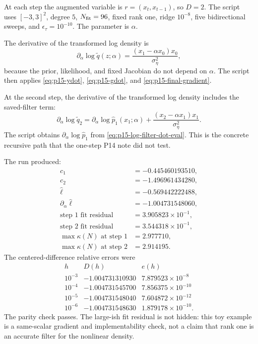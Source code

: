 \documentclass[11pt]{article}
\theoremstyle{definition}
\theoremstyle{remark}
\renewcommand{\[}{\begin{equation}}
\renewcommand{\]}{\end{equation}}
\begin{document}
At each step the augmented variable is \(r=(x_t,x_{t-1})\), so \(D=2\).  The
script uses \([-3,3]^2\), degree \(5\), \(N_{\rm fit}=96\), fixed rank one,
ridge \(10^{-8}\), five bidirectional sweeps, and
\(\epsilon_\tau=10^{-10}\).  The parameter is \(\alpha\).

The derivative of the transformed log density is
\[
  \partial_\alpha\log\widetilde q(z;\alpha)
  =
  \frac{(x_1-\alpha x_0)x_0}{\sigma_\eta^2},
  \label{eq:p15-toy-logqdot}
\]
because the prior, likelihood, and fixed Jacobian do not depend on
\(\alpha\).  The script then applies \eqref{eq:p15-ydot},
\eqref{eq:p15-gdot}, and \eqref{eq:p15-final-gradient}.

At the second step, the derivative of the transformed log density includes the
saved-filter term:
\[
  \partial_\alpha\log\widetilde q_2
  =
  \partial_\alpha\log\widehat p_1(x_1;\alpha)
  +
  \frac{(x_2-\alpha x_1)x_1}{\sigma_\eta^2}.
  \label{eq:p15-toy-step2-dot}
\]
The script obtains \(\partial_\alpha\log\widehat p_1\) from
\eqref{eq:p15-log-filter-dot-eval}.  This is the concrete recursive path that
the one-step P14 note did not test.

The run produced:
\[
\begin{array}{ll}
c_1&=-0.445460193510,\\
c_2&=-1.496961434280,\\
\widehat\ell&=-0.569442222488,\\
\partial_\alpha\widehat\ell&=-1.004731548060,\\
\text{step 1 fit residual}&=3.905823\times10^{-1},\\
\text{step 2 fit residual}&=3.544318\times10^{-1},\\
\max\kappa(N)\text{ at step 1}&=2.977710,\\
\max\kappa(N)\text{ at step 2}&=2.914195.
\end{array}
\]
The centered-difference relative errors were
\[
\begin{array}{ccc}
h & D(h) & e(h)\\
10^{-3} & -1.004731310930 & 7.879523\times10^{-8}\\
10^{-4} & -1.004731545700 & 7.856375\times10^{-10}\\
10^{-5} & -1.004731548040 & 7.604872\times10^{-12}\\
10^{-6} & -1.004731548630 & 1.879178\times10^{-10}.
\end{array}
\]
The parity check passes.  The large-ish fit residual is not hidden: this toy
example is a same-scalar gradient and implementability check, not a claim that
rank one is an accurate filter for the nonlinear density.
\end{document}
